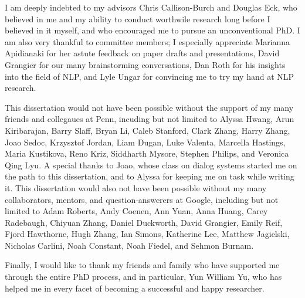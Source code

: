 
I am deeply indebted to my advisors Chris Callison-Burch and Douglas Eck, who believed in me and my ability to conduct worthwile research long before I believed in it myself, and who encouraged me to pursue an unconventional PhD.
I am also very thankful to committee members;
I especially appreciate Marianna Apidianaki for her astute feedback on paper drafts and presentations, David Grangier for our many brainstorming conversations,  Dan Roth for his insights into the field of NLP, and Lyle Ungar for convincing me to try my hand at NLP research.

This dissertation would not have been possible without the support of my many friends and collegaues at Penn, incuding but not limited to
Alyssa Hwang, 
Arun Kiribarajan,
Barry Slaff,
Bryan Li, 
Caleb Stanford,
Clark Zhang,
Harry Zhang,
Joao Sedoc, 
Krzysztof Jordan,
Liam Dugan,
Luke Valenta,
Marcella Hastings,
Maria Kustikova, 
Reno Kriz, 
Siddharth Mysore,
Stephen Philips, and
Veronica Qing Lyu.
A special thanks to Joao, whose class on dialog systems started me on the path to this dissertation, and to Alyssa for keeping me on task while writing it.
This dissertation would also not have been possible without my many collaborators, mentors, and question-answerers at Google, including but not limited to
Adam Roberts, 
Andy Coenen,
Ann Yuan,
Anna Huang,
Carey Radebaugh,
Chiyuan Zhang,
Daniel Duckworth,
David Grangier,
Emily Reif,
Fjord Hawthorne,
Hugh Zhang,
Ian Simons,
Katherine Lee,
Matthew Jagielski,
Nicholas Carlini,
Noah Constant,
Noah Fiedel, and
Sehmon Burnam.

Finally, I would like to thank my friends and family who have supported me through the entire PhD process,
and in particular, Yun William Yu, who has helped me in every facet of becoming a successful and happy researcher.


